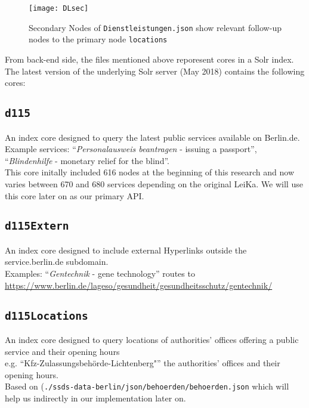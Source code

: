 \begin{figure}[H]
	\caption[Secondary Nodes of \texttt{Dienstleistungen.json} ]{Secondary Nodes of \texttt{Dienstleistungen.json} show relevant follow-up nodes to the primary node \texttt{locations}}
	\label{LeiKaJSON2}
	\texttt{[image: DLsec]}
\end{figure}







\begin{flushleft}


From back-end side, the files mentioned above reporesent cores in a Solr index. The latest version of the underlying Solr server (May 2018) contains the following cores:

	\subsection*{\texttt{d115}}
	 An index core designed to query the latest public services available on Berlin.de. \\ Example services: ``\textit{Personalausweis beantragen} - issuing a passport'', ``\textit{Blindenhilfe} - monetary relief for the blind''.\\  This core initally included 616 nodes at the beginning of this research and now varies between 670 and 680 services depending on the original LeiKa. We will use this core later on as our primary API.
	
\subsection*{\texttt{d115Extern}}
	An index core designed to include external Hyperlinks outside the service.berlin.de subdomain.\\
	Examples: ``\textit{Gentechnik} - gene technology'' routes to 
	\url{https://www.berlin.de/lageso/gesundheit/gesundheitsschutz/gentechnik/}
	
	\subsection*{\texttt{d115Locations}}
	An index core designed to query locations of authorities' offices offering a public service and their opening hours\\ %
	e.g. ``Kfz-Zulassungsbehörde-Lichtenberg"''
	the authorities' offices and their opening hours.\\
	Based on (\texttt{./ssds-data-berlin/json/behoerden/behoerden.json} which will help us indirectly in our implementation later on. 
	

\end{flushleft}
